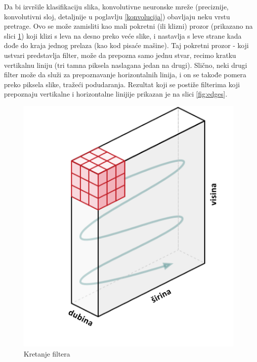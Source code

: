 \documentclass[a4paper]{article}
\begin{document}

Da bi izvršile klasifikaciju slika, konvolutivne neuronske mreže (preciznije, konvolutivni sloj, detaljnije u poglavlju \ref{konvolucija}) obavljaju neku vrstu pretrage. Ovo se može zamisliti kao mali pokretni (ili klizni) prozor (prikazano na slici \ref{fig:filter_movement01}) koji klizi s leva na desno preko veće slike, i nastavlja s leve strane kada dođe do kraja jednog prelaza (kao kod pisaće mašine). Taj pokretni prozor - koji ustvari predstavlja filter, može da prepozna samo jednu stvar, recimo kratku vertikalnu liniju (tri tamna piksela naslagana jedan na drugi). Slično, neki drugi filter može da služi za prepoznavanje horizontalnih linija, i on se takođe pomera preko piksela slike, tražeći podudaranja. Rezultat koji se postiže filterima koji prepoznaju vertikalne i horizontalne linijije prikazan je na slici \ref{fig:edges}.


\begin{figure}[h!]
\begin{center}
\includegraphics[scale=0.4]{filter_movement01.jpg}
\end{center}
\caption{Kretanje filtera}
\label{fig:filter_movement01}
\end{figure}
\end{document}
